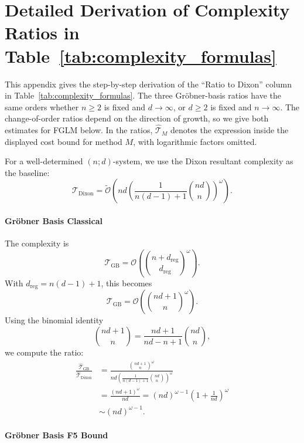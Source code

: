 \newpage

\section{Detailed Derivation of Complexity Ratios in Table~\ref{tab:complexity_formulas}}
\label{Appendix:Derivation}

This appendix gives the step-by-step derivation of the ``Ratio to Dixon'' column in Table~\ref{tab:complexity_formulas}. The three Gr\"obner-basis ratios have the same orders whether $n\ge2$ is fixed and $d\to\infty$, or $d\ge2$ is fixed and $n\to\infty$. The change-of-order ratios depend on the direction of growth, so we give both estimates for FGLM below. In the ratios, $\widehat{\mathcal T}_M$ denotes the expression inside the displayed cost bound for method $M$, with logarithmic factors omitted.

For a well-determined $(n;d)$-system, we use the Dixon resultant complexity as the baseline:
\[
\mathcal T_{\mathrm{Dixon}}
=\widetilde{\mathcal O}\!\left(nd\left(\frac{1}{n(d-1)+1}\binom{nd}{n}\right)^\omega\right).
\]

\paragraph{Gr\"obner Basis Classical~\cite{Faugere2004}}

The complexity is
\[
\mathcal T_{\mathrm{GB}}
=\mathcal O\!\left(\binom{n+d_{\mathrm{reg}}}{d_{\mathrm{reg}}}^\omega\right).
\]
With $d_{\mathrm{reg}}=n(d-1)+1$, this becomes
\[
\mathcal T_{\mathrm{GB}}
=\mathcal O\!\left(\binom{nd+1}{n}^\omega\right).
\]
Using the binomial identity
\[
\binom{nd+1}{n}=\frac{nd+1}{nd-n+1}\binom{nd}{n},
\]
we compute the ratio:
\begin{align*}
\frac{\widehat{\mathcal T}_{\mathrm{GB}}}{\widehat{\mathcal T}_{\mathrm{Dixon}}}
&=\frac{\binom{nd+1}{n}^{\omega}}{nd\left(\frac{1}{n(d-1)+1}\binom{nd}{n}\right)^\omega}\\
&=\frac{(nd+1)^\omega}{nd}
=(nd)^{\omega-1}\left(1+\frac{1}{nd}\right)^\omega\\
&\sim(nd)^{\omega-1}.
\end{align*}

\paragraph{Gr\"obner Basis F5 Bound~\cite{DBLP:journals/jsc/BardetFS15,DBLP:journals/tosc/BariantBLP22}}

